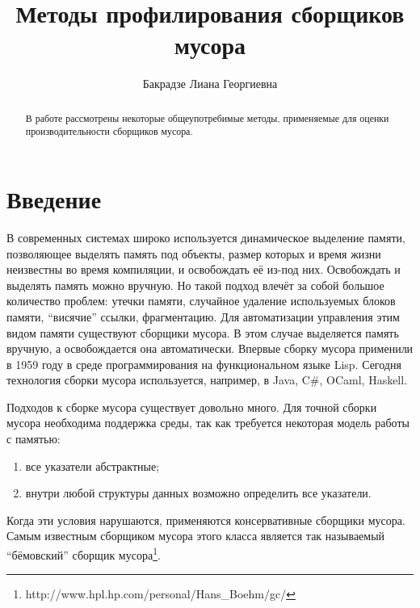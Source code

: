 \title{Методы профилирования сборщиков мусора}
%
\author{Бакрадзе Лиана Георгиевна}
%
%
%

\maketitle              %

\begin{abstract}
В работе рассмотрены некоторые общеупотребимые методы, применяемые для
оценки производительности сборщиков мусора.
\end{abstract}
%


\section*{Введение}
В современных системах широко используется динамическое выделение памяти, позволяющее 
выделять память под объекты, размер которых и время жизни неизвестны во время компиляции, 
и освобождать её из-под них. Освобождать и выделять память можно вручную. Но такой
подход влечёт за собой большое количество проблем: утечки памяти, случайное удаление 
используемых блоков памяти, ``висячие'' ссылки, фрагментацию. Для автоматизации управления этим видом 
памяти существуют сборщики мусора. В этом случае выделяется память вручную, а освобождается 
она автоматически. Впервые сборку мусора применили в 1959 году в среде программирования 
на функциональном языке Lisp. Сегодня технология сборки мусора используется, например,
в Java, C\#, OCaml, Haskell.

Подходов к сборке мусора существует довольно много. Для точной сборки мусора необходима 
поддержка среды, так как требуется некоторая модель работы с памятью:
\begin{enumerate}
\item все указатели абстрактные;
\item внутри любой структуры данных возможно определить все указатели.
\end{enumerate}

Когда эти условия нарушаются, применяются консервативные сборщики мусора. Самым известным
сборщиком мусора этого класса является так называемый ``бёмовский''
сборщик мусора\footnote{http://www.hpl.hp.com/personal/Hans\_Boehm/gc/}. 

